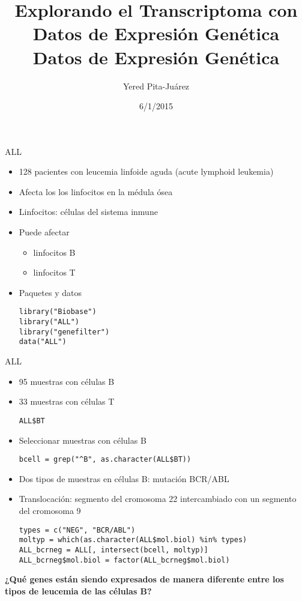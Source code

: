 \documentclass{beamer}
\begin{document}
\title[Datos de Expresi\'{o}n Gen\'{e}tica]{Explorando el Transcriptoma con Datos de Expresi\'{o}n Gen\'{e}tica\\
\vspace{0.5cm}
Datos de Expresi\'{o}n Gen\'{e}tica}
\author{Yered Pita-Ju\'{a}rez}
\date{6/1/2015}


\begin{frame}
\titlepage
\end{frame}

\begin{frame}[fragile]{ALL}
\begin{itemize}
\item 128 pacientes con leucemia linfoide aguda (acute lymphoid leukemia)
\item Afecta los los linfocitos en la médula ósea
\item Linfocitos: células del sistema inmune
\item Puede afectar
\begin{itemize}
	\item linfocitos B
	\item linfocitos T
\end{itemize}
\item Paquetes y datos
\begin{verbatim}
library("Biobase")
library("ALL")
library("genefilter")
data("ALL")
\end{verbatim}
\end{itemize}
\end{frame}

\begin{frame}[fragile]{ALL}
\begin{itemize}
\item 95 muestras con células B
\item 33 muestras con células T
\begin{verbatim}
ALL$BT 
\end{verbatim}
\item Seleccionar muestras con células B
\begin{verbatim}
bcell = grep("^B", as.character(ALL$BT))
\end{verbatim}
\item Dos tipos de muestras en células B: mutación BCR/ABL
\item Translocación: segmento del cromosoma 22 intercambiado con un segmento del cromosoma 9
\begin{verbatim}
types = c("NEG", "BCR/ABL")
moltyp = which(as.character(ALL$mol.biol) %in% types)
ALL_bcrneg = ALL[, intersect(bcell, moltyp)]
ALL_bcrneg$mol.biol = factor(ALL_bcrneg$mol.biol)
\end{verbatim}
\end{itemize}
\textbf{¿Qué genes están siendo expresados de manera diferente entre los tipos de leucemia de las células B?}
\end{frame}
\end{document}
